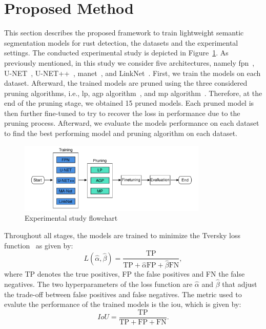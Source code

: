 \documentclass[mathematics,article,submit,pdftex,moreauthors]{Definitions/mdpi}
\begin{document}
\section{Proposed Method}
This section describes the proposed framework
to train lightweight semantic segmentation models
for rust detection, the datasets and the experimental settings.
The conducted experimental study is depicted in Figure~\ref{fig:flowchart-study}.
As previously mentioned, in this study we consider five
architectures, namely \ac{fpn}~\cite{Lin2017}, U-NET~\cite{Ronneberger2015},
U-NET++~\cite{Zhou2018}, \ac{manet}~\cite{Fan2020}, and 
LinkNet~\cite{Chaurasia2017}. First, we train the models
on each dataset. Afterward, the trained models are pruned
using the three considered pruning algorithms, 
i.e., \ac{lp}, \ac{agp} algorithm~\cite{Han2017},
and \ac{mp} algorithm~\cite{Sanh2020}. Therefore,
at the end of the pruning stage, we obtained 15 pruned models.
Each pruned model is then further fine-tuned to try to recover
the loss in performance due to the pruning process. Afterward,
we evaluate the models performance on each dataset to find
the best performing model and pruning algorithm on each dataset. 

\begin{figure}[htbp]
  \begin{center}
  \includegraphics[width=0.8\textwidth]{figures/flowchart-study.pdf}
  \caption{Experimental study flowchart}
  \label{fig:flowchart-study}
  \end{center}
\end{figure}

Throughout all stages, the models are trained to minimize
the Tversky loss function~\cite{Salehi2017} as given
by:
\begin{equation}
    L(\hat{\alpha}, \hat{\beta}) = \frac{\text{TP}}{\text{TP}+
    \hat{\alpha}\text{FP} +  \hat{\beta}\text{FN}},
\end{equation}
where TP denotes the true positives, FP the false positives
and FN the false negatives. The two hyperparameters of 
the loss function are $\hat{\alpha}$ and $\hat{\beta}$
that adjust the trade-off between false positives and
false negatives. The metric used to evalute the performance of the trained
models is the \ac{iou}, which is given by:
\begin{equation}
    IoU = \frac{\text{TP}}{\text{TP}+\text{FP}+\text{FN}}.
\end{equation}
\end{document}
